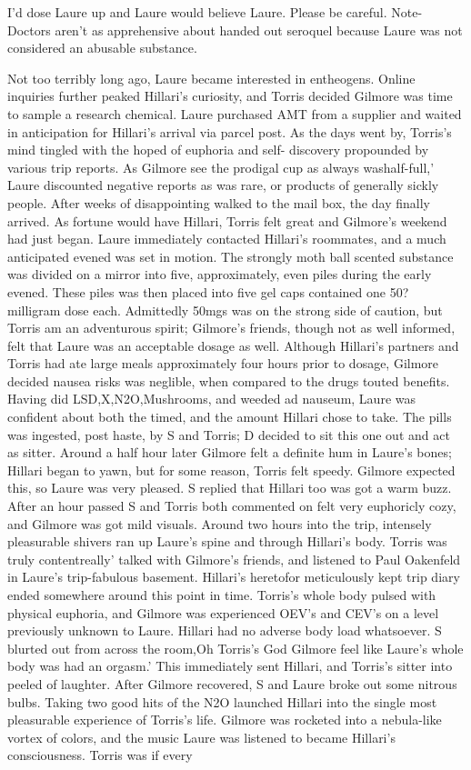 \documentclass[12pt]{book}
\begin{document}
I'd dose Laure up and Laure would believe Laure. Please be careful. Note- Doctors aren't as apprehensive about handed out seroquel because Laure was not considered an abusable substance.



Not too terribly long ago, Laure became interested in entheogens. Online inquiries further peaked Hillari's curiosity, and Torris decided Gilmore was time to sample a research chemical. Laure purchased AMT from a supplier and waited in anticipation for Hillari's arrival via parcel post. As the days went by, Torris's mind tingled with the hoped of euphoria and self- discovery propounded by various trip reports. As Gilmore see the prodigal cup as always washalf-full,' Laure discounted negative reports as was rare, or products of generally sickly people. After weeks of disappointing walked to the mail box, the day finally arrived. As fortune would have Hillari, Torris felt great and Gilmore's weekend had just began. Laure immediately contacted Hillari's roommates, and a much anticipated evened was set in motion. The strongly moth ball scented substance was divided on a mirror into five, approximately, even piles during the early evened. These piles was then placed into five gel caps contained one 50? milligram dose each. Admittedly 50mgs was on the strong side of caution, but Torris am an adventurous spirit; Gilmore's friends, though not as well informed, felt that Laure was an acceptable dosage as well. Although Hillari's partners and Torris had ate large meals approximately four hours prior to dosage, Gilmore decided nausea risks was neglible, when compared to the drugs touted benefits. Having did LSD,X,N2O,Mushrooms, and weeded ad nauseum, Laure was confident about both the timed, and the amount Hillari chose to take. The pills was ingested, post haste, by S and Torris; D decided to sit this one out and act as sitter. Around a half hour later Gilmore felt a definite hum in Laure's bones; Hillari began to yawn, but for some reason, Torris felt speedy. Gilmore expected this, so Laure was very pleased. S replied that Hillari too was got a warm buzz. After an hour passed S and Torris both commented on felt very euphoricly cozy, and Gilmore was got mild visuals. Around two hours into the trip, intensely pleasurable shivers ran up Laure's spine and through Hillari's body. Torris was truly contentreally' talked with Gilmore's friends, and listened to Paul Oakenfeld in Laure's trip-fabulous basement. Hillari's heretofor meticulously kept trip diary ended somewhere around this point in time. Torris's whole body pulsed with physical euphoria, and Gilmore was experienced OEV's and CEV's on a level previously unknown to Laure. Hillari had no adverse body load whatsoever. S blurted out from across the room,Oh Torris's God Gilmore feel like Laure's whole body was had an orgasm.' This immediately sent Hillari, and Torris's sitter into peeled of laughter. After Gilmore recovered, S and Laure broke out some nitrous bulbs. Taking two good hits of the N2O launched Hillari into the single most pleasurable experience of Torris's life. Gilmore was rocketed into a nebula-like vortex of colors, and the music Laure was listened to became Hillari's consciousness. Torris was if every 
\end{document}
